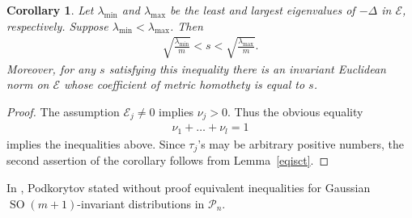 \documentclass[10pt]{amsart}
\newtheorem{corollary}{Corollary}
\theoremstyle{remark}
\begin{document}
\begin{corollary}
Let ${{\mathord{\lambda}}}_{\min}$ and ${{\mathord{\lambda}}}_{\max}$ be the least and largest
eigenvalues of $-{{\mathord{\Delta}}}$ in ${\mathcal{E}}$, respectively. Suppose ${{\mathord{\lambda}}}_{\min}<
{{\mathord{\lambda}}}_{\max}$.  Then
\begin{eqnarray*}
\sqrt{\frac{{{\mathord{\lambda}}}_{\min}}{m}}< s<\sqrt{\frac{{{\mathord{\lambda}}}_{\max}}{m}}.
\end{eqnarray*}
Moreover, for any $s$ satisfying this inequality there is an
invariant Euclidean norm on ${\mathcal{E}}$ whose coefficient of metric
homothety is equal to $s$.
\end{corollary}
\begin{proof}
The assumption ${\mathcal{E}}_j\neq0$ implies $\nu_j>0$. Thus the obvious
equality
\begin{eqnarray*}
\nu_1+\dots+\nu_l=1
\end{eqnarray*}
implies the inequalities above. Since $\tau_j$'s may be arbitrary
positive numbers, the second assertion of the corollary follows
from Lemma~\ref{eqisct}.
\end{proof}
In \cite{Po99}, Podkorytov stated without proof equivalent
inequalities for Gaussian ${\mathop{\mathrm{SO}}}(m+1)$-invariant distributions in
${\mathcal{P}}_n$.
\end{document}
